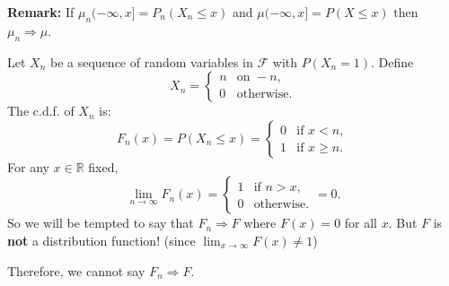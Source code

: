 \textbf{Remark:} If \( \mu_n(-\infty, x] = P_n(X_n \leq x) \) and \( \mu(-\infty, x] = P(X \leq x) \) then \( \mu_n \Rightarrow \mu \).

\begin{example}[Example 25.1]
Let \( X_n \) be a sequence of random variables in \( \mathcal{F} \) with \( P(X_n = 1) \). Define
\[
X_n =
\begin{cases}
n & \text{on } -n,\\
0 & \text{otherwise}.
\end{cases}
\]
The c.d.f. of \( X_n \) is:
\[
F_n(x) = P(X_n \leq x) =
\begin{cases}
0 & \text{if } x < n,\\
1 & \text{if } x \geq n.
\end{cases}
\]
For any \( x \in \mathbb{R} \) fixed,
\[
\lim_{n \to \infty} F_n(x) =
\begin{cases}
1 & \text{if } n > x,\\
0 & \text{otherwise}.
\end{cases}
= 0.
\]
So we will be tempted to say that \( F_n \Rightarrow F \) where \( F(x) = 0 \) for all \( x \).
But \( F \) is \textbf{not} a distribution function! (since \( \lim_{x \to \infty} F(x) \neq 1 \))

Therefore, we cannot say \( F_n \Rightarrow F \).
\end{example}
